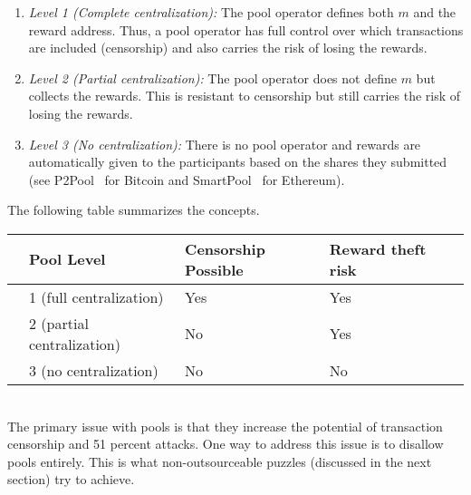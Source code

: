 \documentclass[11pt]{article}
\begin{document}
\begin{enumerate}
	\item {\em Level 1 (Complete centralization):} The pool operator defines both $m$ and the reward address. Thus, a pool operator has full control over which transactions are included (censorship) and also carries the risk of losing the rewards.
	\item {\em Level 2 (Partial centralization):} The pool operator does not define $m$ but collects the rewards. This is resistant to censorship but still carries the risk of losing the rewards. %
	\item {\em Level 3 (No centralization):} There is no pool operator and rewards are automatically given to the participants based on the shares they submitted (see P2Pool~\cite{chesterman2018p2pool} for Bitcoin and SmartPool~\cite{luu2017smartpool} for Ethereum).
\end{enumerate}
The following table summarizes the concepts.\\

	\begin{tabular}{lllll}
		& Pool Level & Censorship Possible & Reward theft risk\\\hline
		& 1 (full centralization)    & Yes & Yes \\
		& 2 (partial centralization)    & No & Yes \\
		& 3 (no centralization)    & No & No 
	\end{tabular}

~\\

The primary issue with pools is that they increase the potential of transaction censorship and 51 percent attacks. One way to address this issue is to disallow pools entirely. This is what non-outsourceable puzzles (discussed in the next section) try to achieve.
\end{document}
